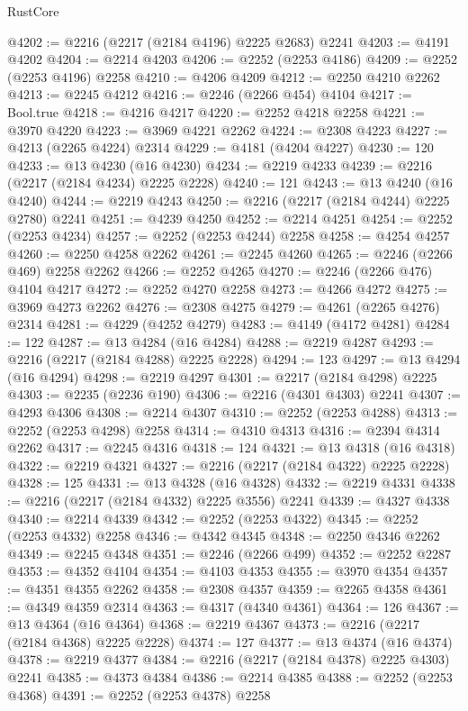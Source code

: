 \begin{lexlean}{RustCore}
\begin{coremodule}
@4202 := @2216 (@2217 (@2184 @4196) @2225 @2683) @2241
@4203 := @4191 @4202
@4204 := @2214 @4203
@4206 := @2252 (@2253 @4186)
@4209 := @2252 (@2253 @4196) @2258
@4210 := @4206 @4209
@4212 := @2250 @4210 @2262
@4213 := @2245 @4212
@4216 := @2246 (@2266 @454) @4104
@4217 := Bool.true
@4218 := @4216 @4217
@4220 := @2252 @4218 @2258
@4221 := @3970 @4220
@4223 := @3969 @4221 @2262
@4224 := @2308 @4223
@4227 := @4213 (@2265 @4224) @2314
@4229 := @4181 (@4204 @4227)
@4230 := 120
@4233 := @13 @4230 (@16 @4230)
@4234 := @2219 @4233
@4239 := @2216 (@2217 (@2184 @4234) @2225 @2228)
@4240 := 121
@4243 := @13 @4240 (@16 @4240)
@4244 := @2219 @4243
@4250 := @2216 (@2217 (@2184 @4244) @2225 @2780) @2241
@4251 := @4239 @4250
@4252 := @2214 @4251
@4254 := @2252 (@2253 @4234)
@4257 := @2252 (@2253 @4244) @2258
@4258 := @4254 @4257
@4260 := @2250 @4258 @2262
@4261 := @2245 @4260
@4265 := @2246 (@2266 @469) @2258 @2262
@4266 := @2252 @4265
@4270 := @2246 (@2266 @476) @4104 @4217
@4272 := @2252 @4270 @2258
@4273 := @4266 @4272
@4275 := @3969 @4273 @2262
@4276 := @2308 @4275
@4279 := @4261 (@2265 @4276) @2314
@4281 := @4229 (@4252 @4279)
@4283 := @4149 (@4172 @4281)
@4284 := 122
@4287 := @13 @4284 (@16 @4284)
@4288 := @2219 @4287
@4293 := @2216 (@2217 (@2184 @4288) @2225 @2228)
@4294 := 123
@4297 := @13 @4294 (@16 @4294)
@4298 := @2219 @4297
@4301 := @2217 (@2184 @4298) @2225
@4303 := @2235 (@2236 @190)
@4306 := @2216 (@4301 @4303) @2241
@4307 := @4293 @4306
@4308 := @2214 @4307
@4310 := @2252 (@2253 @4288)
@4313 := @2252 (@2253 @4298) @2258
@4314 := @4310 @4313
@4316 := @2394 @4314 @2262
@4317 := @2245 @4316
@4318 := 124
@4321 := @13 @4318 (@16 @4318)
@4322 := @2219 @4321
@4327 := @2216 (@2217 (@2184 @4322) @2225 @2228)
@4328 := 125
@4331 := @13 @4328 (@16 @4328)
@4332 := @2219 @4331
@4338 := @2216 (@2217 (@2184 @4332) @2225 @3556) @2241
@4339 := @4327 @4338
@4340 := @2214 @4339
@4342 := @2252 (@2253 @4322)
@4345 := @2252 (@2253 @4332) @2258
@4346 := @4342 @4345
@4348 := @2250 @4346 @2262
@4349 := @2245 @4348
@4351 := @2246 (@2266 @499)
@4352 := @2252 @2287
@4353 := @4352 @4104
@4354 := @4103 @4353
@4355 := @3970 @4354
@4357 := @4351 @4355 @2262
@4358 := @2308 @4357
@4359 := @2265 @4358
@4361 := @4349 @4359 @2314
@4363 := @4317 (@4340 @4361)
@4364 := 126
@4367 := @13 @4364 (@16 @4364)
@4368 := @2219 @4367
@4373 := @2216 (@2217 (@2184 @4368) @2225 @2228)
@4374 := 127
@4377 := @13 @4374 (@16 @4374)
@4378 := @2219 @4377
@4384 := @2216 (@2217 (@2184 @4378) @2225 @4303) @2241
@4385 := @4373 @4384
@4386 := @2214 @4385
@4388 := @2252 (@2253 @4368)
@4391 := @2252 (@2253 @4378) @2258

\end{coremodule}
\end{lexlean}
